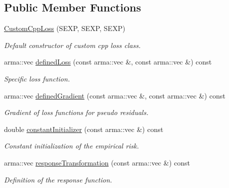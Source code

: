 \subsection*{Public Member Functions}
\begin{DoxyCompactItemize}
\item 
\hyperlink{classloss_1_1_custom_cpp_loss_a0616bfb4c640c63a4307d039b32079d1}{Custom\+Cpp\+Loss} (S\+E\+XP, S\+E\+XP, S\+E\+XP)
\begin{DoxyCompactList}\small\item\em Default constructor of custom cpp loss class. \end{DoxyCompactList}\item 
arma\+::vec \hyperlink{classloss_1_1_custom_cpp_loss_a5611805b67b0542449beb898051ab943}{defined\+Loss} (const arma\+::vec \&, const arma\+::vec \&) const
\begin{DoxyCompactList}\small\item\em Specific loss function. \end{DoxyCompactList}\item 
arma\+::vec \hyperlink{classloss_1_1_custom_cpp_loss_a3ff741b3a4d4c3f3515660dcb7b32781}{defined\+Gradient} (const arma\+::vec \&, const arma\+::vec \&) const
\begin{DoxyCompactList}\small\item\em Gradient of loss functions for pseudo residuals. \end{DoxyCompactList}\item 
double \hyperlink{classloss_1_1_custom_cpp_loss_a7e3691161855a4a3152982274e74c96a}{constant\+Initializer} (const arma\+::vec \&) const
\begin{DoxyCompactList}\small\item\em Constant initialization of the empirical risk. \end{DoxyCompactList}\item 
arma\+::vec \hyperlink{classloss_1_1_custom_cpp_loss_a8ef296a7db08423f68dd389824b5aa77}{response\+Transformation} (const arma\+::vec \&) const
\begin{DoxyCompactList}\small\item\em Definition of the response function. \end{DoxyCompactList}\end{DoxyCompactItemize}
